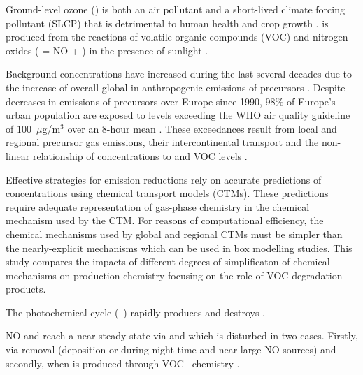 Ground-level ozone () is both an air pollutant and a short-lived climate forcing pollutant (SLCP) that is detrimental to human health and crop growth \citep{AQEU:2014}. 
 is produced from the reactions of volatile organic compounds (VOC) and nitrogen oxides ( = NO + ) in the presence of sunlight \citep{Atkinson:2000}.

Background  concentrations have increased during the last several decades due to the increase of overall global in anthropogenic emissions of  precursors \citep{HTAP:2010}.
Despite decreases in emissions of  precursors over Europe since 1990, $98$\% of Europe's urban population are exposed to levels exceeding the WHO air quality guideline of \mbox{$100$ $\mu$g/m$^3$} over an \mbox{$8$-hour} mean \citep{WHO:2006}. 
These exceedances result from local and regional  precursor gas emissions, their intercontinental transport and the non-linear relationship of  concentrations to  and VOC levels \citep{AQEU:2014}.

Effective strategies for emission reductions rely on accurate predictions of  concentrations using chemical transport models (CTMs). 
These predictions require adequate representation of gas-phase chemistry in the chemical mechanism used by the CTM. 
For reasons of computational efficiency, the chemical mechanisms used by global and regional CTMs must be simpler than the nearly-explicit mechanisms which can be used in box modelling studies.
This study compares the impacts of different degrees of simplificaton of chemical mechanisms on  production chemistry focusing on the role of VOC degradation products.

The photochemical cycle (--) rapidly produces and destroys .
\begin{reactionlist}
\end{reactionlist}
NO and  reach a near-steady state via  and  which is disturbed in two cases. 
Firstly, via  removal (deposition or  during night-time and near large NO sources) and secondly, when  is produced through VOC-- chemistry \citep{Sillman:1999}.

